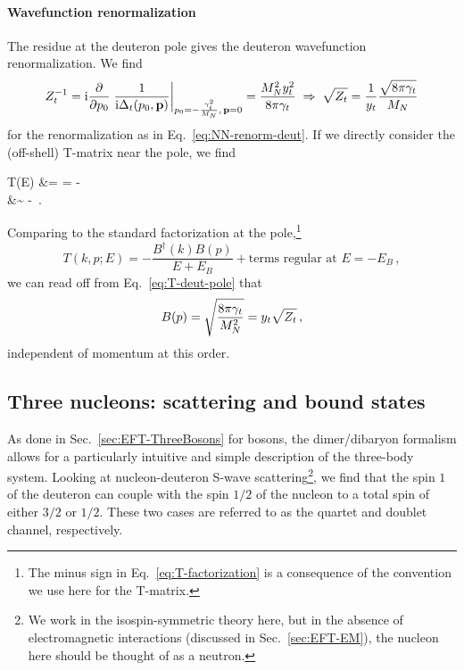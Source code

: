 \paragraph{Wavefunction renormalization}

The residue at the deuteron pole gives the deuteron wavefunction 
renormalization.  We find
%
\begin{equation}
 Z_t^{-1} = \ii\frac{\partial}{\partial p_0}
 \left.\frac{1}{\ii\Delta_t(p_0,{\mathbf{p}})}\right|_{p_0=-\frac{\gamt^2}{\MN},\,{\mathbf{p}}=0}
 = \frac{\MN^2 \yt^2}{8\pi\gamt}
 \;\Rightarrow\;
 \sqrt{Z_t} = \frac{1}{\yt} \frac{\sqrt{8\pi\gamt\mathstrut}}{\MN}
\label{eq:Zd}
\end{equation}
%
for the renormalization as in Eq.~\eqref{eq:NN-renorm-deut}.  If we 
directly consider the (off-shell) T-matrix near the pole, we find
%
\begin{spliteq}
 T(E) &= \frac{4\pi}{\MN}
 = {-}\frac{4\pi}{\MN}
  \\
 &\sim
 {-} 
  \,.
\label{eq:T-deut-pole}
\end{spliteq}
%
Comparing to the standard factorization at the pole,\footnote{The minus sign in 
Eq.~\eqref{eq:T-factorization} is a consequence of the convention we use here 
for the T-matrix.}
%
\begin{equation}
 T(k,p;E) = {-}\frac{B^\dagger(k)B(p)}{E+E_B}
 + \text{terms regular at $E=-E_B$} \,,
\label{eq:T-factorization}
\end{equation}
%
we can read off from Eq.~\eqref{eq:T-deut-pole} that
%
\begin{equation}
 B(p) = \sqrt{\frac{8\pi\gamt}{\MN^2}} = \yt\sqrt{Z_t} \,,
\label{eq:B-deut}
\end{equation}
%
independent of momentum at this order.

\subsection{Three nucleons: scattering and bound states}

As done in Sec.~\ref{sec:EFT-ThreeBosons} for bosons, the dimer/dibaryon 
formalism allows for a particularly intuitive and simple description of the 
three-body system.  Looking at nucleon-deuteron S-wave scattering\footnote{We 
work in the isospin-symmetric theory here, but in the absence of 
electromagnetic interactions (discussed in Sec.~\ref{sec:EFT-EM}), the nucleon 
here should be thought of as a neutron.}, we find that the spin $1$ of the 
deuteron can couple with the spin $1/2$ of the nucleon to a total spin of 
either $3/2$ or $1/2$.  These two cases are referred to as the quartet and 
doublet channel, respectively.

